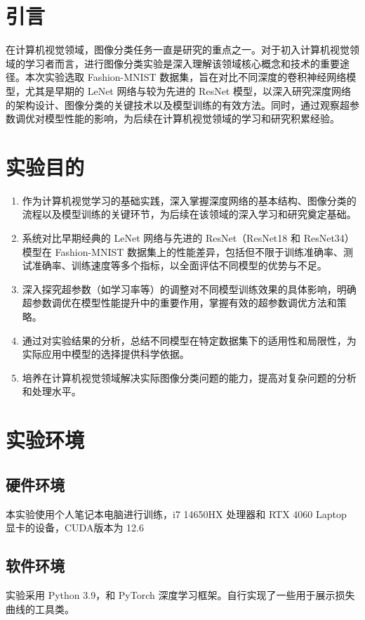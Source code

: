 \documentclass[UTF8]{ctexart}
\begin{document}
\tableofcontents  %


\newpage
\section{引言}
在计算机视觉领域，图像分类任务一直是研究的重点之一。对于初入计算机视觉领域的学习者而言，进行图像分类实验是深入理解该领域核心概念和技术的重要途径。本次实验选取 Fashion-MNIST 数据集，旨在对比不同深度的卷积神经网络模型，尤其是早期的 LeNet 网络与较为先进的 ResNet 模型，以深入研究深度网络的架构设计、图像分类的关键技术以及模型训练的有效方法。同时，通过观察超参数调优对模型性能的影响，为后续在计算机视觉领域的学习和研究积累经验。

\section{实验目的}
\begin{enumerate}
\item 作为计算机视觉学习的基础实践，深入掌握深度网络的基本结构、图像分类的流程以及模型训练的关键环节，为后续在该领域的深入学习和研究奠定基础。
\item 系统对比早期经典的 LeNet 网络与先进的 ResNet（ResNet18 和 ResNet34）模型在 Fashion-MNIST 数据集上的性能差异，包括但不限于训练准确率、测试准确率、训练速度等多个指标，以全面评估不同模型的优势与不足。
\item 深入探究超参数（如学习率等）的调整对不同模型训练效果的具体影响，明确超参数调优在模型性能提升中的重要作用，掌握有效的超参数调优方法和策略。
\item 通过对实验结果的分析，总结不同模型在特定数据集下的适用性和局限性，为实际应用中模型的选择提供科学依据。
\item 培养在计算机视觉领域解决实际图像分类问题的能力，提高对复杂问题的分析和处理水平。
\end{enumerate}

\section{实验环境}
\subsection{硬件环境}
本实验使用个人笔记本电脑进行训练，i7 14650HX 处理器和 RTX 4060 Laptop 显卡的设备，CUDA版本为 12.6

\subsection{软件环境}
实验采用 Python 3.9，和 PyTorch 深度学习框架。自行实现了一些用于展示损失曲线的工具类。
\end{document}
